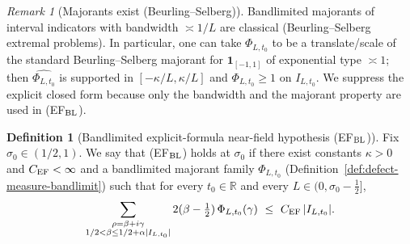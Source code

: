 \documentclass[11pt]{article}
\theoremstyle{definition}
\newtheorem{definition}[theorem]{Definition}
\theoremstyle{remark}
\newtheorem{remark}[theorem]{Remark}
\theoremstyle{definition}
\newcommand{\R}{\mathbb{R}}
\begin{document}
\begin{remark}[Majorants exist (Beurling--Selberg)]\label{rem:beurling-selberg}
Bandlimited majorants of interval indicators with bandwidth $\asymp 1/L$ are classical (Beurling--Selberg extremal problems).
In particular, one can take $\Phi_{L,t_0}$ to be a translate/scale of the standard Beurling--Selberg majorant for $\mathbf 1_{[-1,1]}$ of exponential type $\asymp 1$; then $\widehat{\Phi_{L,t_0}}$ is supported in $[-\kappa/L,\kappa/L]$ and $\Phi_{L,t_0}\ge 1$ on $I_{L,t_0}$.
We suppress the explicit closed form because only the bandwidth and the majorant property are used in \textup{(EF$_{\rm BL}$)}.
\end{remark}

\begin{definition}[Bandlimited explicit-formula near-field hypothesis \textup{(EF$_{\rm BL}$)}]\label{def:EFBL}
Fix $\sigma_0\in(1/2,1)$. We say that \textup{(EF$_{\rm BL}$)} holds at $\sigma_0$ if there exist constants $\kappa>0$ and $C_{\rm EF}<\infty$ and a bandlimited majorant family $\Phi_{L,t_0}$ (Definition~\ref{def:defect-measure-bandlimit}) such that for every $t_0\in\R$ and every $L\in(0,\sigma_0-\tfrac12]$,
\begin{equation}\label{eq:EFBL-inequality}
  \sum_{\substack{\rho=\beta+i\gamma\\ 1/2<\beta\le 1/2+\alpha|I_{L,t_0}|}} 2(\beta-\tfrac12)\,\Phi_{L,t_0}(\gamma)\ \le\ C_{\rm EF}\,|I_{L,t_0}|.
\end{equation}
\end{definition}
\end{document}
